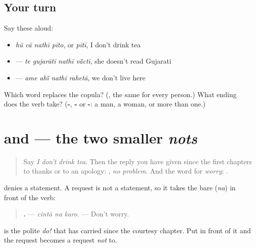 \subsection*{Your turn}
Say these aloud:

\begin{itemize}
\raggedright
  \item \emph{hũ cā nathī pīto}, or \emph{pītī}, I don't drink tea
  \item \textbf{   } — \emph{te gujarātī nathī vā̃ctī}, she doesn't read Gujarati
  \item \textbf{   } — \emph{ame ahī̃ nathī rahetā}, we don't live here
\end{itemize}

\begin{tcolorbox}[breakable,colback=teal!4,colframe=teal!35!black,title={Before you move on}]
Which word replaces the copula? (\textbf{}, the same for every person.) What ending does the verb take? (\textbf{-}, \textbf{-} or \textbf{-}: a man, a woman, or more than one.)
\end{tcolorbox}
\section[\texorpdfstring{\gu{ન} … · … \gu{નહીં} (na … · … nahī̃)}{ન … · … નહીં (na … · … nahī̃)}]{ and  — the two smaller \emph{nots}}

\label{lesson:GU-C145-na-nahi}



\begin{quote}
Say \emph{I don't drink tea}. Then the reply you have given since the first chapters to thanks or to an apology: \textbf{ }, \emph{no problem}. And the word for \emph{worry}: \textbf{}.
\end{quote}

\begin{grammarlens}[title={Grammar Lens: \gu{ન} in front of a request}]
\textbf{} denies a statement. A request is not a statement, so it takes the bare \textbf{} (\emph{na}) in front of the verb:

\begin{quote}
\textbf{  .} — \emph{cintā na karo.} — Don't worry.
\end{quote}

\textbf{} is the polite \emph{do!} that \textbf{ } has carried since the courtesy chapter. Put \textbf{} in front of it and the request becomes a request \emph{not} to.
\end{grammarlens}

